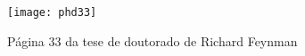 
\begin{figure}[!h]
  \centering
    \texttt{[image: phd33]}
    \caption{Página 33 da tese de doutorado de Richard Feynman}
\end{figure}
